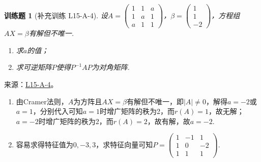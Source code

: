 \documentclass[UTF8,12pt,a4paper,fontset=fandol]{ctexart}
\newtheorem{exercise}{训练题}[section]
\begin{document}
\begin{exercise}[补充训练 L15-A-4]\label{prob:L15-A-4}
设$A=\begin{pmatrix}
                1 & 1 & a \\
                1 & a & 1 \\
                a & 1 & 1
            \end{pmatrix}$，$\beta=\begin{pmatrix}
                1 \\ 1 \\ -2
            \end{pmatrix}$，方程组$AX=\beta$有解但不唯一.
        \begin{enumerate}
            \item 求$a$的值；

            \item 求可逆矩阵$P$使得$P^{-1}AP$为对角矩阵.
        \end{enumerate}
\end{exercise}
\noindent 来源：\href{https://github.com/yhwu-is/Linear-Algebra-Left-Undone/blob/new/%E8%AE%B2%E4%B9%89/%E4%B8%93%E9%A2%98/15%20%E7%9B%B8%E4%BC%BC%E6%A0%87%E5%87%86%E5%BD%A2%EF%BC%9A%E5%A4%8D%E6%95%B0%E5%9F%9F%E4%B8%8A%E7%9A%84%E5%B0%9D%E8%AF%95%E4%B8%8E%E7%90%86%E8%AE%BA.tex}{L15-A-4}。
\begin{solve}
\begin{enumerate}
              \item 由Cramer法则，$A$为方阵且$AX=\beta$有解但不唯一，即$|A|\neq 0$，解得$a=-2$或$a=1$，分别代入可知$a=1$时增广矩阵的秩为2，而$r(A)=1$，故无解；$a=-2$时增广矩阵的秩为2，而$r(A)=2$，故有解，故$a=-2$.

              \item 容易求得特征值为$0,-3,3$，求特征向量可知$P=\begin{pmatrix}
                            1 & -1 & 1 \\ 1 & 0 & -2 \\ 1 & 1 & 1
                        \end{pmatrix}$.
          \end{enumerate}
\end{solve}
\end{document}
